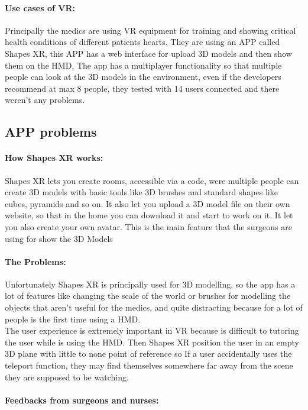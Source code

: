 \paragraph{Use cases of VR:}
Principally the medics are using VR equipment for training and showing critical health conditions of different patients hearts.
They are using an APP called Shapes XR, this APP has a web interface for upload 3D models and then show them on the \ac{HMD}.
The app has a multiplayer functionality so that multiple people can look at the 3D models in the environment, even if the developers recommend at max 8 people, they tested with 14 users connected and there weren't any problems.

\subsection{APP problems}

\paragraph{How Shapes XR works:}
Shapes XR lets you create rooms, accessible via a code, were multiple people can create 3D models with basic tools like 3D brushes and standard shapes like cubes, pyramids and so on.
It also let you upload a 3D model file on their own website, so that in the home you can download it and start to work on it.
It let you also create your own avatar.
This is the main feature that the surgeons are using for show the 3D Models

\paragraph{The Problems:}
Unfortunately Shapes XR is principally used for 3D modelling, so the app has a lot of features like changing the scale of the world or brushes for modelling the objects that aren't useful for the medics,
and quite distracting because for a lot of people is the first time using a \ac{HMD}.\\
The user experience is extremely important in \ac{VR} because is difficult to tutoring the user while is using the \ac{HMD}.
Then Shapes XR position the user in an empty 3D plane with little to none point of reference so If a user accidentally uses the teleport function, they may find themselves somewhere far away from the scene they are supposed to be watching.

\paragraph{Feedbacks from surgeons and nurses:}

